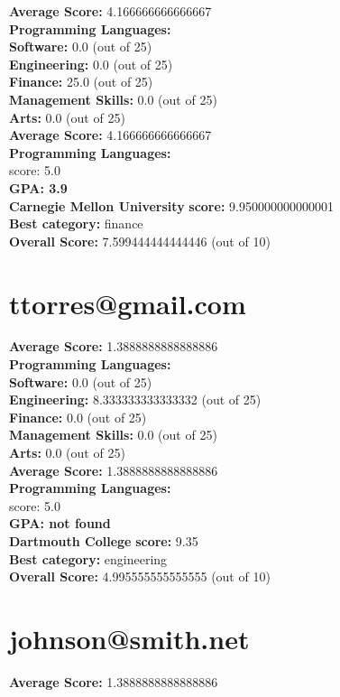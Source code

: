 \documentclass{article}
\begin{document}
\textbf{Average Score: } 4.166666666666667\\
\textbf{Programming Languages:} \\
\textbf{Software:} 0.0 (out of 25)\\
    \textbf{Engineering: } 0.0 (out of 25)\\
    \textbf{Finance:} 25.0 (out of 25)\\
    \textbf{Management Skills:} 0.0 (out of 25)\\
    \textbf{Arts:} 0.0 (out of 25)\\
\textbf{Average Score: } 4.166666666666667\\
\textbf{Programming Languages:} \\
score: 5.0\\
\textbf{GPA: 3.9}\\
\textbf{Carnegie Mellon University} \textbf{score:} 9.950000000000001\\
\textbf{Best category: } finance\\
    \textbf{Overall Score: }7.599444444444446 (out of 10)\section{ttorres@gmail.com}
\textbf{Average Score: } 1.3888888888888886\\
\textbf{Programming Languages:} \\
\textbf{Software:} 0.0 (out of 25)\\
    \textbf{Engineering: } 8.333333333333332 (out of 25)\\
    \textbf{Finance:} 0.0 (out of 25)\\
    \textbf{Management Skills:} 0.0 (out of 25)\\
    \textbf{Arts:} 0.0 (out of 25)\\
\textbf{Average Score: } 1.3888888888888886\\
\textbf{Programming Languages:} \\
score: 5.0\\
\textbf{GPA: not found}\\
\textbf{Dartmouth College} \textbf{score:} 9.35\\
\textbf{Best category: } engineering\\
    \textbf{Overall Score: }4.995555555555555 (out of 10)\section{johnson@smith.net}
\textbf{Average Score: } 1.3888888888888886\\
\end{document}
